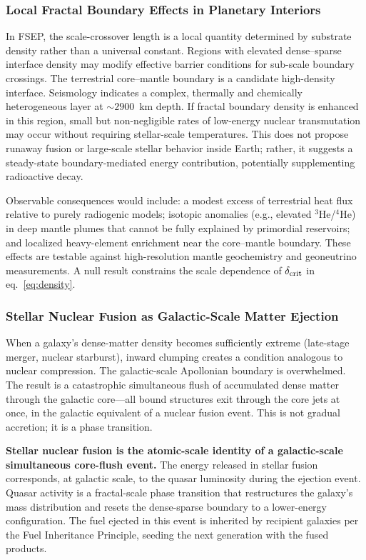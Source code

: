 \documentclass[11pt,letterpaper]{article}
\begin{document}
\subsubsection{Local Fractal Boundary Effects in Planetary Interiors}
In FSEP, the scale-crossover length is a local quantity determined by substrate
density rather than a universal constant. Regions with elevated dense--sparse
interface density may modify effective barrier conditions for sub-scale boundary
crossings. The terrestrial core--mantle boundary is a candidate high-density
interface. Seismology indicates a complex, thermally and chemically heterogeneous
layer at $\sim2900$~km depth. If fractal boundary density is enhanced in this
region, small but non-negligible rates of low-energy nuclear transmutation may
occur without requiring stellar-scale temperatures. This does not propose runaway
fusion or large-scale stellar behavior inside Earth; rather, it suggests a
steady-state boundary-mediated energy contribution, potentially supplementing
radioactive decay.

Observable consequences would include: a modest excess of terrestrial heat flux
relative to purely radiogenic models; isotopic anomalies (e.g., elevated
$^3$He/$^4$He) in deep mantle plumes that cannot be fully explained by primordial
reservoirs; and localized heavy-element enrichment near the core--mantle boundary.
These effects are testable against high-resolution mantle geochemistry and
geoneutrino measurements. A null result constrains the scale dependence of
$\delta_{\rm crit}$ in eq.~\eqref{eq:density}.

\subsubsection{Stellar Nuclear Fusion as Galactic-Scale Matter Ejection}
\label{sec:fusion}
When a galaxy's dense-matter density becomes sufficiently extreme (late-stage
merger, nuclear starburst), inward clumping creates a condition analogous to nuclear
compression. The galactic-scale Apollonian boundary is overwhelmed. The result is a
catastrophic simultaneous flush of accumulated dense matter through the galactic
core---all bound structures exit through the core jets at once, in the galactic
equivalent of a nuclear fusion event. This is not gradual accretion; it is a phase
transition.

\textbf{Stellar nuclear fusion is the atomic-scale identity of a galactic-scale
simultaneous core-flush event.} The energy released in stellar fusion corresponds,
at galactic scale, to the quasar luminosity during the ejection event. Quasar
activity is a fractal-scale phase transition that restructures the galaxy's mass
distribution and resets the dense-sparse boundary to a lower-energy configuration.
The fuel ejected in this event is inherited by recipient galaxies per the Fuel
Inheritance Principle, seeding the next generation with the fused products.
\end{document}

